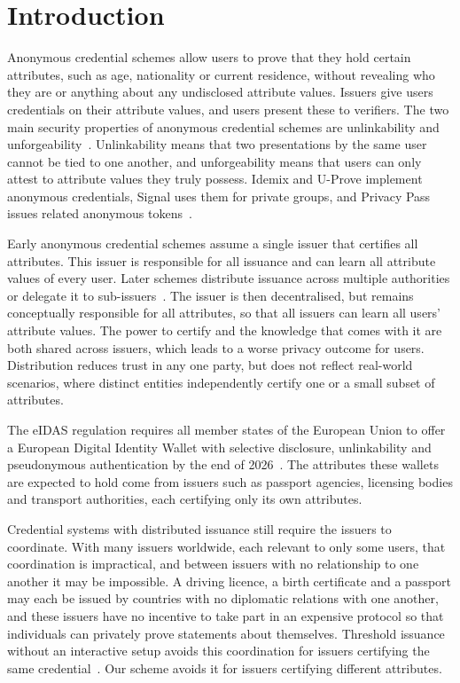 \section{Introduction}

Anonymous credential schemes allow users to prove that they hold certain
attributes, such as age, nationality or current residence, without revealing
who they are or anything about any undisclosed attribute values. Issuers give
users credentials on their attribute values, and users present these to
verifiers. The two main security properties of anonymous credential schemes are
unlinkability and unforgeability~\cite{EC:CamLys01}. Unlinkability means that
two presentations by the same user cannot be tied to one another, and
unforgeability means that users can only attest to attribute values they truly
possess. Idemix and U-Prove implement anonymous credentials, Signal uses them
for private groups, and Privacy Pass issues related anonymous
tokens~\cite{CCS:CamVan02,UProve,CCS:ChaPerZav20,PoPETS:DGSTV18}.

Early anonymous credential schemes assume a single issuer that certifies all
attributes. This issuer is responsible for all issuance and can learn all
attribute values of every user. Later schemes distribute issuance across
multiple authorities or delegate it to
sub-issuers~\cite{NDSS:SABMD19,SP:DKLsT23,CCS:KRBKKL24}. The issuer is then
decentralised, but remains conceptually responsible for all attributes, so that
all issuers can learn all users' attribute values. The power to certify and the
knowledge that comes with it are both shared across issuers, which leads to a
worse privacy outcome for users. Distribution reduces trust in any one party, but does not reflect real-world scenarios,
where distinct entities independently certify one or a small subset of
attributes.

The eIDAS regulation requires all member states of the European Union to offer
a European Digital Identity Wallet with selective disclosure, unlinkability and
pseudonymous authentication by the end of 2026~\cite{eIDAS2024}. The attributes these wallets are expected
to hold come from issuers such as passport agencies, licensing bodies and
transport authorities, each certifying only its own attributes.

Credential systems with distributed issuance still require the issuers to
coordinate. With many issuers worldwide, each relevant to only some users, that
coordination is impractical, and between issuers with no relationship to one
another it may be impossible. A driving licence, a birth certificate and a
passport may each be issued by countries with no diplomatic relations with one
another, and these issuers have no incentive to take part in an expensive
protocol so that individuals can privately prove statements about themselves. Threshold issuance without an interactive setup
avoids this coordination for issuers certifying the same
credential~\cite{EPRINT:GGPR25}. Our scheme avoids it for issuers certifying
different attributes.

